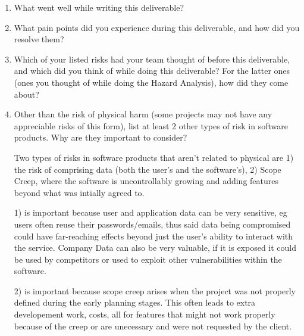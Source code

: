 \documentclass{article}
\begin{document}
\begin{enumerate}
    \item What went well while writing this deliverable? 
    \item What pain points did you experience during this deliverable, and how
    did you resolve them?
    \item Which of your listed risks had your team thought of before this
    deliverable, and which did you think of while doing this deliverable? For
    the latter ones (ones you thought of while doing the Hazard Analysis), how
    did they come about?
    \item Other than the risk of physical harm (some projects may not have any
    appreciable risks of this form), list at least 2 other types of risk in
    software products. Why are they important to consider?

    Two types of risks in software products that aren't related to physical 
    are 1) the risk of comprising data (both the user's and the software's), 2) 
    Scope Creep, where the software is uncontrollably growing and adding features
    beyond what was intially agreed to. 

    1) is important because user and application data can be very sensitive, eg
    users often reuse their passwords/emails, thus said data being compromised could
    have far-reaching effects beyond just the user's ability to interact with the service.
    Company Data can also be very valuable, if it is exposed it could be used by competitors 
    or used to exploit other vulnerabilities within the software.

    2) is important because scope creep arises when the project was not properly 
    defined during the early planning stages. This often leads to extra developement work,
    costs, all for features that might not work properly because of the creep or are 
    unecessary and were not requested by the client. 

\end{enumerate}
\end{document}
